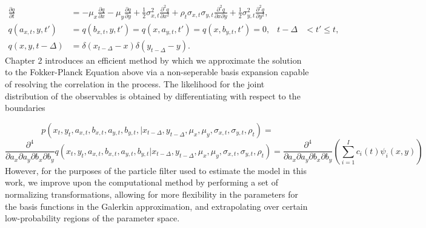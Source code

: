 \documentclass[10pt]{article}
\begin{document}
\begin{align}
  \displaystyle \frac{\partial q}{\partial t}  &= -\mu_x \frac{\partial q}{\partial x}
                                         - \mu_y \frac{\partial q}{\partial y}
                                         + \frac{1}{2}\sigma_{x,t}^2 \frac{\partial^2 q }{\partial x^2}
                                         + \rho_t\sigma_{x,t}\sigma_{y,t} \frac{\partial^2 q}{\partial x \partial y}
                                         + \frac{1}{2}\sigma_{y,t}^2 \frac{\partial^2 q}{\partial y^2}, \\
  q(a_{x,t}, y,t') &= q(b_{x,t},y,t') = q(x,a_{y,t},t') = q(x,b_{y,t},t') = 0,& t-\Delta &< t' \leq t, \\
  q(x,y,t-\Delta) &= \delta(x_{t-\Delta} - x)\delta(y_{t-\Delta} - y).
\end{align}
Chapter 2 introduces an efficient method by which we approximate the
solution to the Fokker-Planck Equation above via a non-seperable basis
expansion capable of resolving the correlation in the process. The
likelihood for the joint distribution of the observables is obtained
by differentiating with respect to the boundaries

\[
  p(x_t,y_t, a_{x,t}, b_{x,t}, a_{y,t},b_{y,t},| x_{t-\Delta},
  y_{t-\Delta}, \mu_x, \mu_y, \sigma_{x,t}, \sigma_{y,t}, \rho_t) =
\]
\[
  \frac{\partial^4}{\partial a_x \partial a_y\partial b_x \partial
    b_y} q(x_t, y_t, a_{x,t}, b_{x,t}, a_{y,t}, b_{y,t} |
  x_{t-\Delta}, y_{t-\Delta}, \mu_x, \mu_y, \sigma_{x,t},
  \sigma_{y,t}, \rho_t) = \frac{\partial^4}{\partial a_x \partial
    a_y\partial b_x \partial b_y} \left( \sum_{i=1}^I c_i(t)
    \psi_i(x,y) \right)
\]
However, for the purposes of the particle filter used to estimate the
model in this work, we improve upon the computational method by
performing a set of normalizing transformations, allowing for more
flexibility in the parameters for the basis functions in the Galerkin
approximation, and extrapolating over certain low-probability regions
of the parameter space.
\end{document}
